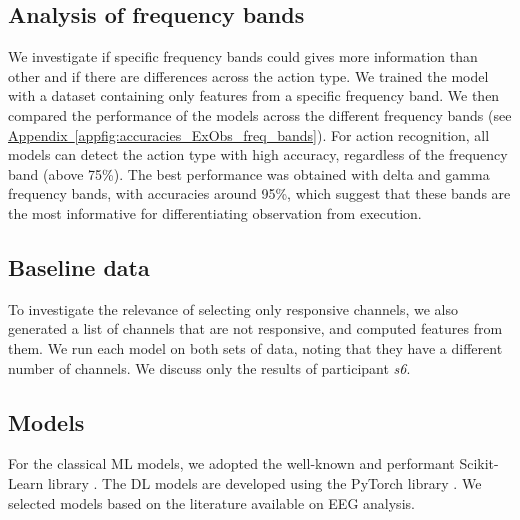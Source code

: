 \documentclass[10pt,conference,compsocconf]{IEEEtran}
\newcommand{\aref}[1]{\hyperref[#1]{Appendix~\ref*{#1}}}
\begin{document}
\vspace{-1.5em}

\vspace{-1.1em}
\subsection{Analysis of frequency bands}
We investigate if specific frequency bands could gives more information than other and if there are differences across the action type. We trained the model with a dataset containing only features from a specific frequency band. We then compared the performance of the models across the different frequency bands (see \aref{appfig:accuracies_ExObs_freq_bands}). For action recognition, all models can detect the action type with high accuracy, regardless of the frequency band (above 75\%). The best performance was obtained with delta and gamma frequency bands, with accuracies around 95\%, which suggest that these bands are the most informative for differentiating observation from execution.

\subsection{Baseline data}
To investigate the relevance of selecting only responsive channels, we also generated a list of channels that are not responsive, and computed features from them. We run each model on both sets of data, noting that they have a different number of channels. We discuss only the results of participant \textit{s6}.

\subsection{Models}
For the classical ML models, we adopted the well-known and performant Scikit-Learn library \cite{scikitlearn}. The DL models are developed using the PyTorch library \cite{pytorch}. We selected models based on the literature available on EEG analysis.
\end{document}
